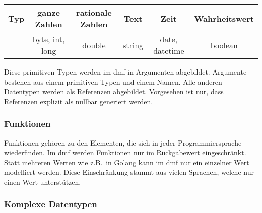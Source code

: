 \documentclass[./einleitung.tex]{subfiles}
\begin{document}
    \begin{center}
        \begin{tabular}{| c || c | c | c | c | c |}
            \hline
            Typ & ganze Zahlen & rationale Zahlen & Text & Zeit & Wahrheitswert \\
            \hline
            & byte, int, long & double & string & date, datetime & boolean \\
            \hline
        \end{tabular}
    \end{center}

    Diese primitiven Typen werden im \acrshort{dmf} in Argumenten abgebildet.
    Argumente bestehen aus einem primitiven Typen und einem Namen.
    Alle anderen Datentypen werden als Referenzen abgebildet.
    Vorgesehen ist nur, dass Referenzen explizit als nullbar generiert werden.

    \subsubsection{Funktionen}
    Funktionen gehören zu den Elementen, die sich in jeder Programmiersprache wiederfinden.
    Im \acrshort{dmf} werden Funktionen nur im Rückgabewert eingeschränkt.
    Statt mehreren Werten wie z.B.\ in Golang kann im \acrshort{dmf} nur ein einzelner Wert modelliert werden.
    Diese Einschränkung stammt aus vielen Sprachen, welche nur einen Wert unterstützen.

    \subsubsection{Komplexe Datentypen}
\end{document}
